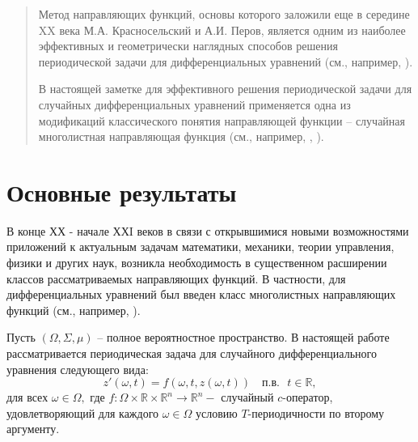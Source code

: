 
\maketitle

\begin{abstract}
Метод направляющих функций, основы которого заложили еще в середине XX века М.А. Красносельский и А.И. Перов, является одним из наиболее эффективных и геометрически наглядных способов решения периодической задачи для дифференциальных уравнений (см., например, \cite{k_kr}).

В настоящей заметке для эффективного решения периодической задачи для случайных дифференциальных уравнений применяется одна из модификаций классического понятия направляющей функции -- случайная многолистная направляющая функция (см., например, \cite{k_k_o_z_2}, \cite{o_k_k}).

\end{abstract}

\section{Основные результаты} %

В конце ХХ - начале ХХI веков в связи с открывшимися новыми возможностями приложений к актуальным задачам математики, механики, теории управления, физики и других наук, возникла необходимость в существенном расширении классов рассматриваемых направляющих функций. В частности, для дифференциальных уравнений был введен класс многолистных направляющих функций (см., например, \cite{k_r}).

Пусть $(\Omega,\Sigma,\mu)$ -- полное вероятностное пространство. В настоящей работе рассматривается периодическая задача для случайного дифференциального уравнения следующего вида:
\begin{equation}\label{eq1.1}
 z'(\omega, t) = f(\omega,t,z(\omega,t)) \quad \mbox{п.в.}\,\,\,\, t\in \mathbb{R},
\end{equation}
для всех $\omega \in \Omega,$ где $f\colon \Omega \times \mathbb{R} \times \mathbb{R}^n \to \mathbb{R}^n -$ случайный $c$-оператор, удовлетворяющий для каждого $\omega \in \Omega$ условию $T$-периодичности по второму аргументу.


